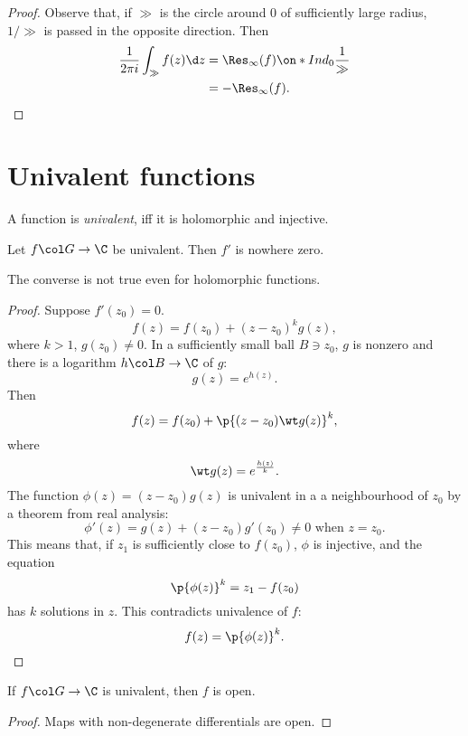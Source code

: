 \begin{proof}
  Observe that, if $\gg$ is the circle around 0 of sufficiently large radius, $1/\gg$ is passed in the opposite direction. Then
  \begin{align*}
    \frac{1}{2 \pi i} \int_\gg f(z) \d z
    &= \Res_\infty(f) \Ind_0 \frac{1}{\gg} \\
    &= -\Res_\infty(f). 
  \end{align*}
\end{proof}

\section{Univalent functions}

\begin{definition}
  A function is \emph{univalent}, iff it is holomorphic and injective.
\end{definition}

\begin{theorem}
  Let $f \col G \to \C$ be univalent.
  Then $f'$ is nowhere zero.  
\end{theorem}

\begin{remark}
  The converse is not true even for holomorphic functions.  
\end{remark}

\begin{proof}
  Suppose $f'(z_0) = 0$.
  $$ f(z) = f(z_0) + (z-z_0)^k g(z), $$
  where $k > 1$, $g(z_0) \ne 0$.
  In a sufficiently small ball $B \ni z_0$, $g$ is nonzero and there is a logarithm $h \col B \to \C$ of $g$:
  $$ g(z) = e^{h(z)}. $$
  Then
  $$ f(z) = f(z_0) + \p{(z-z_0) \wt g(z)}^k, $$
  where
  $$ \wt g(z) = e^{\frac{h(z)}{k}}. $$
  The function $\phi(z) = (z-z_0) g(z)$ is univalent in a a neighbourhood of $z_0$ by a theorem from real analysis:
  $$ \phi'(z) = g(z) + (z-z_0) g'(z_0) \ne 0 \text{ when $z = z_0$}. $$
  This means that, if $z_1$ is sufficiently close to $f(z_0)$, $\phi$ is injective, and the equation
  $$ \p{\phi(z)}^k = z_1-f(z_0) $$
  has $k$ solutions in $z$.
  This contradicts univalence of $f$:
  $$ f(z) = \p{\phi(z)}^k. $$
\end{proof}

\begin{lemma}
  If $f \col G \to \C$ is univalent, then $f$ is open.
\end{lemma}

\begin{proof}
  Maps with non-degenerate differentials are open.
\end{proof}

